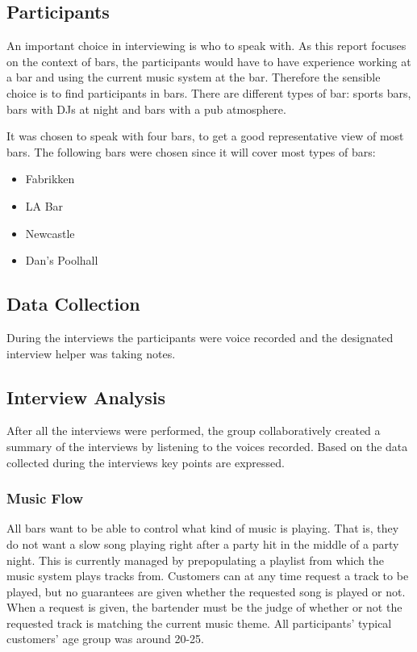 \subsection{Participants}

An important choice in interviewing is who to speak with. As this report focuses on the context of bars, the participants would have to have experience working at a bar and using the current music system at the bar. Therefore the sensible choice is to find participants in bars. There are different types of bar: sports bars, bars with DJs at night and bars with a pub atmosphere.

It was chosen to speak with four bars, to get a good representative view of most bars. The following bars were chosen since it will cover most types of bars:

\begin{itemize}
  \item Fabrikken
  \item LA Bar
  \item Newcastle
  \item Dan's Poolhall
\end{itemize}

\subsection{Data Collection}
\label{sub:data_collection}

During the interviews the participants were voice recorded and the designated interview helper was taking notes. 

\subsection{Interview Analysis}
\label{sub:interview_analysis}

After all the interviews were performed, the group collaboratively created a summary of the interviews by listening to the voices recorded. Based on the data collected during the interviews key points are expressed. 

\subsubsection{Music Flow}
\label{ssub:Music Flow}


All bars want to be able to control what kind of music is playing. That is, they do not want a slow song playing right after a party hit in the middle of a party night. This is currently managed by prepopulating a playlist from which the music system plays tracks from. Customers can at any time request a track to be played, but no guarantees are given whether the requested song is played or not. When a request is given, the bartender must be the judge of whether or not the requested track is matching the current music theme. All participants' typical customers' age group was around 20-25.

